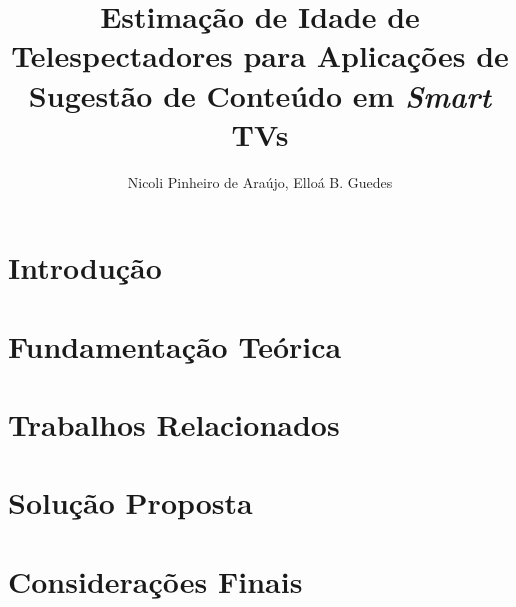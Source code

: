 \documentclass[12pt]{article}
\title{Estimação de Idade de Telespectadores para Aplicações de Sugestão de Conteúdo em \emph{Smart} TVs}
\author{Nicoli Pinheiro de Araújo, Elloá B. Guedes}
\begin{document}

\maketitle



\section{Introdução}\label{sec:intro}


\section{Fundamentação Teórica}\label{sec:fund_teorica}


\section{Trabalhos Relacionados}\label{sec:trab_relac}


\section{Solução Proposta}\label{sec:solucao_proposta}


\section{Considerações Finais}\label{sec:consid_finais}



\end{document}
